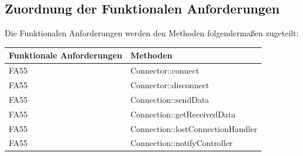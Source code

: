 \subsection{Zuordnung der Funktionalen Anforderungen}

Die Funktionalen Anforderungen werden den Methoden folgendermaßen zugeteilt:


\begin{table}[h]
	\centering
	\begin{tabular}{|l|l|}
    	\hline
    	\textbf{Funktionale Anforderungen} & \textbf{Methoden} \\ \hline
		FA55 & Connector::connect \\ \hline
    	FA55 & Connector::disconnect \\ \hline    	
    	FA55 & Connection::sendData \\ \hline
    	FA55 & Connection::getReceivedData \\ \hline
    	FA55 & Connection::lostConnectionHandler \\ \hline
    	FA55 & Connection::notifyController \\ \hline

	\end{tabular}
\end{table}